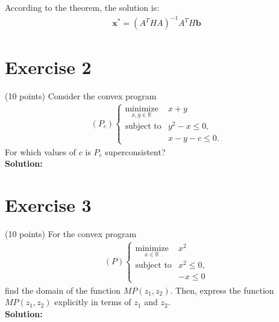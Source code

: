 \documentclass{article}
\begin{document}
According to the theorem, the solution is:
\begin{align*}
\mathbf{x}^* = (A^T H A)^{-1} A^T H \mathbf{b}
\end{align*}

\newpage

\section*{Exercise 2}
(10 points) Consider the convex program
\begin{align*}
(P_c) \begin{cases}
\underset{x,y\in\mathbb{R}}{\text{minimize}} & x + y \\
\text{subject to} & y^2 - x \leq 0, \\
& x - y - c \leq 0.
\end{cases}
\end{align*}
For which values of $c$ is $P_c$ superconsistent? \\

\textbf{Solution:} \\



\newpage

\section*{Exercise 3}
(10 points) For the convex program
\begin{align*}
(P) \begin{cases}
\underset{x\in\mathbb{R}}{\text{minimize}} & x^2 \\
\text{subject to} & x^2 \leq 0, \\
& -x \leq 0
\end{cases}
\end{align*}
find the domain of the function $MP(z_1, z_2)$. Then, express the function $MP(z_1, z_2)$ explicitly in terms of $z_1$ and $z_2$. \\

\textbf{Solution:} \\



\newpage
\end{document}

